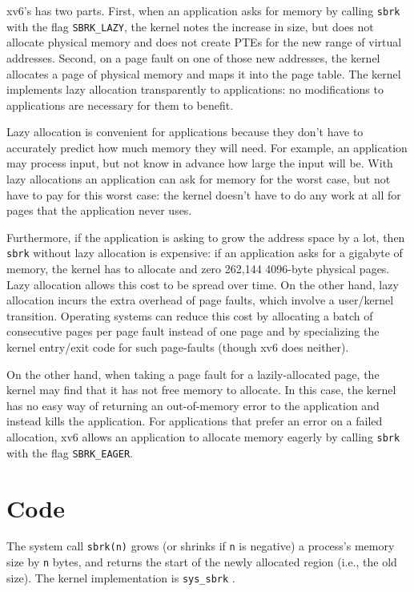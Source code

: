 xv6's  has two parts.
First, when an application asks for memory by calling
\lstinline{sbrk} with the flag \lstinline{SBRK_LAZY}, the kernel notes the increase in size, but does not
allocate physical memory and does not create PTEs for the new range of
virtual addresses.  Second, on a page fault on one of those new
addresses, the kernel allocates a page of physical memory and maps it
into the page table.  The kernel implements lazy allocation
transparently to applications: no modifications to applications are
necessary for them to benefit.

Lazy allocation is convenient for applications because they don't have
to accurately predict how much memory they will need.  For example, an
application may process input, but not know in advance how large the
input will be.  With lazy allocations an application can ask for
memory for the worst case, but not have to pay for this worst case:
the kernel doesn't have to do any work at all for pages that the
application never uses.

Furthermore, if the application is asking to grow the address space by
a lot, then \lstinline{sbrk} without lazy allocation is expensive: if
an application asks for a gigabyte of memory, the kernel has to
allocate and zero 262,144 4096-byte physical pages.  Lazy allocation allows
this cost to be spread over time.  On the other hand, lazy allocation
incurs the extra overhead of page faults, which involve a user/kernel
transition.  Operating systems can reduce this cost by allocating a
batch of consecutive pages per page fault instead of one page and by
specializing the kernel entry/exit code for such page-faults (though
xv6 does neither).

On the other hand, when taking a page fault for a lazily-allocated
page, the kernel may find that it has not free memory to allocate.  In
this case, the kernel has no easy way of returning an out-of-memory
error to the application and instead kills the application.  For
applications that prefer an error on a failed allocation, xv6 allows
an application to allocate memory eagerly by calling \lstinline{sbrk}
with the flag \lstinline{SBRK_EAGER}.

\section{Code}

The system call {\tt sbrk(n)} grows (or shrinks if {\tt n}
is negative) a process's memory size by {\tt n} bytes, and returns
the start of the newly allocated region (i.e., the old size).
The kernel implementation is \lstinline{sys_sbrk}
.


